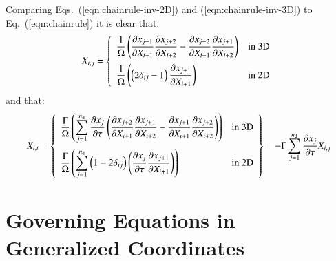 \documentclass{warpdoc}
\newcommand{\alb}{\vspace{0.2cm}\\} %
\newcommand{\nd}{{{n}_{\rm d}}}
\newcommand{\mfd}{\displaystyle}
\begin{document}
%
Comparing Eqs.\  (\ref{eqn:chainrule-inv-2D}) and
(\ref{eqn:chainrule-inv-3D}) to Eq.\  (\ref{eqn:chainrule})
it is clear that:
%
\begin{equation}
\label{eqn:Xij}
X_{i,j}=\left\{
  \begin{array}{ll}
    \mfd\frac{1}{\Omega} \left( \mfd\frac{\partial x_{j+1}}{\partial X_{i+1}}
                                \mfd\frac{\partial x_{j+2}}{\partial X_{i+2}}
                               -\mfd\frac{\partial x_{j+2}}{\partial X_{i+1}}
                                \mfd\frac{\partial x_{j+1}}{\partial X_{i+2}} \right)
        & {\rm in~3D} \alb
    \mfd\frac{1}{\Omega} \left( \left( 2 \delta_{ij}-1\right) \mfd\frac{\partial x_{j+1}}{\partial X_{i+1}}
                         \right)
        & {\rm in~2D}
  \end{array}
\right.
\end{equation}
%
and that:
%
\begin{equation}
\label{eqn:Xit}
X_{i,t}=\left\{
  \begin{array}{ll}
    \mfd\frac{\Gamma}{\Omega}  \left( \mfd\sum_{j=1}^\nd \frac{\partial x_j}{\partial \tau}
        \left( \frac{\partial x_{j+2}}{\partial X_{i+1}} \frac{\partial x_{j+1}}{\partial X_{i+2}}
              -\frac{\partial x_{j+1}}{\partial X_{i+1}} \frac{\partial x_{j+2}}{\partial X_{i+2}}\right) \right)
        & {\rm in~3D} \alb
     \mfd \frac{\Gamma}{\Omega} \left( \sum_{j=1}^\nd \left( 1-2 \delta_{ij}\right)
                   \left( \frac{\partial x_{j}}{\partial \tau}
                          \frac{\partial x_{j+1}}{\partial X_{i+1}}
                          \right) \right)
        & {\rm in~2D}
  \end{array}
\right\}=
-\Gamma \mfd\sum_{j=1}^\nd \frac{\partial x_j}{\partial \tau} X_{i,j}
\end{equation}
%





\section{Governing Equations in Generalized Coordinates}
\end{document}
